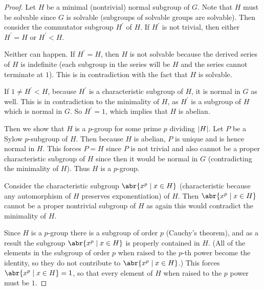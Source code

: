 \documentclass[11pt]{article}
\begin{document}
\begin{enumerate}
\begin{proof}
      Let $H$ be a minimal (nontrivial) normal subgroup of $G$. Note that $H$ must be solvable since $G$ is solvable (subgroups of solvable groups are solvable). Then consider the commutator subgroup $H^{\prime}$ of $H$. If $H^{\prime}$ is not trivial, then either $H^{\prime} = H$ or $H^{\prime} < H$. 
      
      Neither can happen. If $H^{\prime} = H$, then $H$ is not solvable because the derived series of $H$ is indefinite (each subgroup in the series will be $H$ and the series cannot terminate at $1$). This is in contradiction with the fact that $H$ is solvable.
      
      If $1\neq H^{\prime} < H$, because $H^{\prime}$ is a characteristic subgroup of $H$, it is normal in $G$ as well. This is in contradiction to the minimality of $H$, as $H^{\prime}$ is a subgroup of $H$ which is normal in $G$. So $H^{\prime} = 1$, which implies that $H$ is abelian.

      Then we show that $H$ is a $p$-group for some prime $p$ dividing $\abs{H}$. Let $P$ be a Sylow $p$-subgroup of $H$. Then because $H$ is abelian, $P$ is unique and is hence normal in $H$. This forces $P = H$ since $P$ is not trivial and also cannot be a proper characteristic subgroup of $H$ since then it would be normal in $G$ (contradicting the minimality of $H$). Thus $H$ is a $p$-group.

      Consider the characteristic subgroup $\abr{x^p\mid x\in H}$ (characteristic because any automorphism of $H$ preserves exponentiation) of $H$. Then $\abr{x^p\mid x\in H}$ cannot be a proper nontrivial subgroup of $H$ as again this would contradict the minimality of $H$.

      Since $H$ is a $p$-group there is a subgroup of order $p$ (Cauchy's theorem), and as a result the subgroup $\abr{x^p\mid x\in H}$ is properly contained in $H$. (All of the elements in the subgroup of order $p$ when raised to the $p$-th power become the identity, so they do not contribute to $\abr{x^p\mid x\in H}$.) This forces $\abr{x^p\mid x\in H} = 1$, so that every element of $H$ when raised to the $p$ power must be $1$.


\end{proof}
\end{enumerate}
\end{document}
